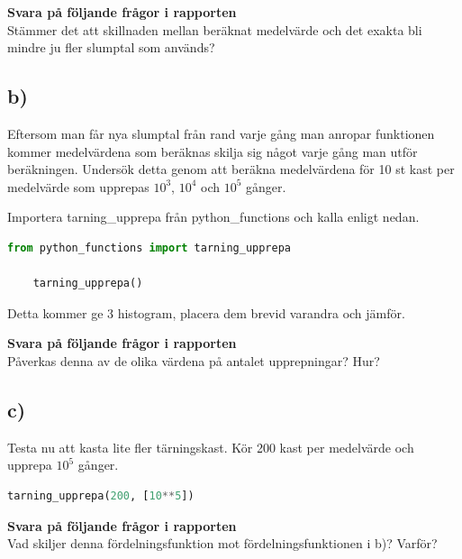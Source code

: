 \documentclass[a4paper]{article}
\begin{document}
\textbf{Svara på följande frågor i rapporten}\\
Stämmer det att skillnaden mellan beräknat medelvärde och det exakta bli mindre ju fler slumptal som används?


\subsection{b)}
\label{sec:2b}
Eftersom man får nya slumptal från rand varje gång man anropar funktionen kommer medelvärdena som
beräknas skilja sig något varje gång man utför beräkningen.
Undersök detta genom att beräkna medelvärdena för 10 st kast per medelvärde som upprepas \( 10^3 \),
\( 10^4 \) och \( 10^5 \) gånger.

Importera tarning\_upprepa från python\_functions och kalla enligt nedan.
\begin{lstlisting}[language=Python]
    from python_functions import tarning_upprepa

    tarning_upprepa()
\end{lstlisting}
Detta kommer ge 3 histogram, placera dem brevid varandra och jämför.

\textbf{Svara på följande frågor i rapporten}\\
Påverkas denna av de olika värdena på antalet upprepningar? Hur?


\subsection{c)}
Testa nu att kasta lite fler tärningskast. Kör 200 kast per medelvärde och upprepa \( 10^5 \) gånger.
\begin{lstlisting}[language=Python]
    tarning_upprepa(200, [10**5])
\end{lstlisting}

\textbf{Svara på följande frågor i rapporten}\\
Vad skiljer denna fördelningsfunktion mot fördelningsfunktionen i b)? Varför?
\newpage
\end{document}
